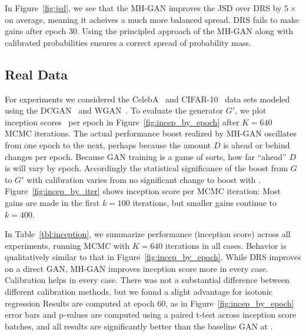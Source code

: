\documentclass{article}
\begin{document}
In Figure~\ref{fig:jsd}, we see that the MH-GAN improves the JSD over DRS by $5 \times$ on average, meaning it acheives a much more balanced spread.
DRS fails to make gains after epoch 30.
Using the principled approach of the MH-GAN along with calibrated probabilities ensures a correct spread of probability mass.



\subsection{Real Data}

For experiments we considered the CelebA~\citep{Liu2015} and CIFAR-10~\citep{Torralba2008} data sets modeled using the DCGAN~\citep{Radford2015} and WGAN~\citep{Arjovsky2017}.
To evaluate the generator $G'$, we plot inception scores~\citep{Salimans2016} per epoch in Figure~\ref{fig:incep_by_epoch} after $K=640$ MCMC iterations.
The actual performance boost realized by MH-GAN oscillates from one epoch to the next, perhaps because the amount $D$ is ahead or behind changes per epoch.
Because GAN training is a game of sorts, how far ``ahead'' $D$ is will vary by epoch.
Accordingly the statistical significance of the boost from $G$ to $G'$ with calibration varies from no significant change to boost with .
Figure~\ref{fig:incep_by_iter} shows inception score per MCMC iteration:
Most gains are made in the first $k=100$ iterations, but smaller gains continue to $k=400$.

In Table~\ref{tbl:inception}, we summarize performance (inception score) across all experiments, running MCMC with $K=640$ iterations in all cases.
Behavior is qualitatively similar to that in Figure~\ref{fig:incep_by_epoch}.
While DRS improves on a direct GAN, MH-GAN improves inception score more in every case.
Calibration helps in every case.
There was not a substantial difference between different calibration methods, but we found a slight advantage for isotonic regression
Results are computed at epoch 60, as in Figure~\ref{fig:incep_by_epoch} error bars and p-values are computed using a paired t-test across inception score batches, and all results are significantly better than the baseline GAN at .


\end{document}
